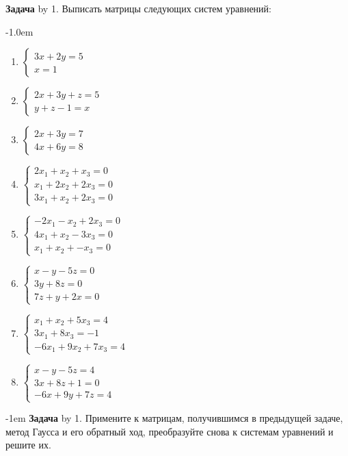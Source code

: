 \documentclass[a4paper,10pt]{article}
\def\problem{\textbf{Задача \the\problemnum}\advance\problemnum by 1}
\begin{document}
\problem. Выписать матрицы следующих систем уравнений: \par\kern-1.0em

\begin{multicols}{4}
	\begin{enumerate}[label=(\arabic*)\,]
		\item 
$\begin{cases}
    3x + 2y = 5 \\
    x  = 1
\end{cases}$
		\item 
$\begin{cases}
    2x + 3y + z = 5 \\
    y+z-1  = x
\end{cases}$
		\item 
$\begin{cases}
    2x + 3y = 7 \\
    4x + 6y = 8
\end{cases}$
		\item 
$\begin{cases}
    2x_1 + x_2 + x_3 = 0 \\
    x_1 + 2x_2 + 2x_3 =0 \\
    3x_1 + x_2 + 2x_3 = 0
\end{cases}$
		\item 
$\begin{cases}
    -2x_1 - x_2 + 2x_3 = 0 \\
    4x_1 + x_2 -3x_3 =0 \\
    x_1 + x_2 + -x_3 = 0
\end{cases}$
		\item 
$\begin{cases}
    x -y -5z =0\\
    3y + 8z=0 \\
    7z +y +2x=0
\end{cases}$
		\item 
$\begin{cases}
    x_1 + x_2 + 5x_3 = 4 \\
    3x_1+ 8x_3 =-1 \\
    -6x_1 +9x_2 +7x_3 = 4
\end{cases}$
		\item 
$\begin{cases}
    x  -y  -5z = 4 \\
    3x + 8z + 1=0 \\
    -6x + 9y + 7z = 4
\end{cases}$
	\end{enumerate}
\end{multicols}\par\kern-1em
\problem. Примените к матрицам, получившимся в предыдущей задаче, метод Гаусса и его обратный ход, преобразуйте снова к системам уравнений и решите их.
\end{document}
